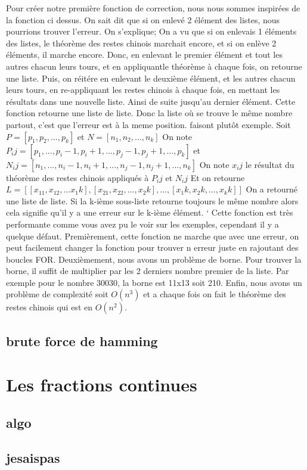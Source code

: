 \documentclass[a4paper, 11pt]{article}
\begin{document}
\newline 
\newline
Pour créer notre première fonction de correction, nous nous sommes inspirées de la fonction ci dessus. On sait dit que si on enlevé 2 élément des listes, nous pourrions trouver l'erreur. On s'explique;
On a vu que si on enlevais 1 éléments des listes, le théorème des restes chinois marchait encore, et si on enlève 2 éléments, il marche encore. Donc, en enlevant le premier élément et tout les autres chacun leurs
tours, et en appliquantle théorème à chaque fois, on retourne une liste. Puis, on réitére en enlevant le deuxième élément, et les autres chacun leurs tours, en re-appliquant les restes chinois à chaque fois, en mettant les résultats dans
une nouvelle liste. Ainsi de suite jusqu'au dernier élément. Cette fonction retourne une liste de liste. Donc la liste où se trouve le même nombre partout, c'est que l'erreur est à la meme position.
faisont plutôt exemple.
\newline
Soit $P=[p_1, p_2, ... , p_k]$ et $N=[n_1 , n_2, ... ,n_k]$ \newline
On note $P_ij =[p_1 , ... , p_i-1 , p_i+1 , ... , p_j-1 , p_j+1 , ... , p_k]$ et $N_ij=[n_1, ..., n_i-1, n_i+1, ..., n_j-1, n_j+1, ..., n_k]$ \newline
On note $x_ij$ le résultat du théorème des restes chinois appliqués à $P_ij$ et $N_ij$ \newline
Et on retourne $L=[[x_11,x_12,...x_1k],[x_21,x_22,...,x_2k],...,[x_1k,x_2k,...,x_kk]]$ \newline
On a retourné une liste de liste. Si la k-ième sous-liste retourne toujours le même nombre alors cela signifie qu'il y a une erreur sur le k-ième élément. \newline`
\newline
Cette fonction est très performante comme vous avez pu le voir sur les exemples, cependant il y a quelque défaut. Premièrement, cette fonction ne marche que avec une erreur,
on peut facilement changer la fonction pour trouver n erreur juste en rajoutant des boucles FOR. Deuxièmement, nous avons un problème de borne. Pour trouver la borne,
il suffit de multiplier par les 2 derniers nombre premier de la liste. \newline
Par exemple pour le nombre 30030, la borne est 11x13 soit 210.\newline
Enfin, nous avons un problème de complexité soit $O(n^3)$ et a chaque fois on fait le théorème des restes chinois qui est en $O(n^2)$.

\newpage
\subsection{brute force de hamming}


\newpage
\section{Les fractions continues} 
\subsection{algo}
\newpage
\subsection{jesaispas}
\end{document}
